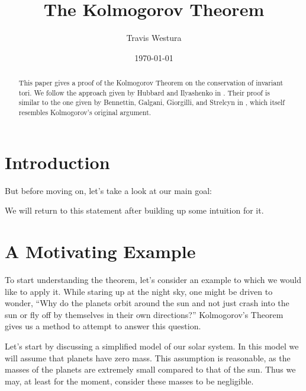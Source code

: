 \documentclass[twoside,letterpaper,10pt]{article}
\title{The Kolmogorov Theorem}
\author{Travis Westura}
\date{\today}
\begin{document}
\maketitle

\begin{abstract}
  This paper gives a proof of the Kolmogorov Theorem on the conservation of
  invariant tori.
  We follow the approach given by Hubbard and Ilyashenko in .
  Their proof is similar to the one given by Bennettin, Galgani, Giorgilli, and
  Strelcyn in , which itself resembles Kolmogorov's original argument.
\end{abstract}


\section{Introduction}
\label{sec:introduction}


But before moving on, let's take a look at our main goal:
\begin{thm}
  \label{thm:KAM}
  \KAM{}
\end{thm}
We will return to this statement after building up some intuition for it.

\section{A Motivating Example}
\label{sec:motivating-example}

To start understanding the theorem, let's consider an example to which we would
like to apply it.
While staring up at the night sky, one might be driven to wonder, ``Why do the
planets orbit around the sun and not just crash into the sun or fly off by
themselves in their own directions?''
Kolmogorov's Theorem gives us a method to attempt to answer this question.

Let's start by discussing a simplified model of our solar system.
In this model we will assume that planets have zero mass.
This assumption is reasonable, as the masses of the planets are extremely small
compared to that of the sun.
Thus we may, at least for the moment, consider these masses to be negligible.
\end{document}
